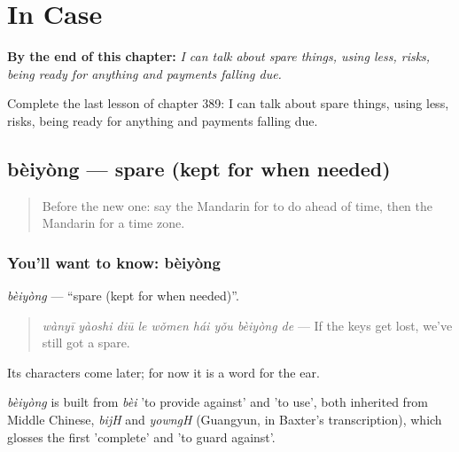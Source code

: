 
\chapter{In Case}
\label{ch:zh-in-case}

\begin{chapteropening}
\textbf{By the end of this chapter:} \emph{I can talk about spare things, using less, risks, being ready for anything and payments falling due.}

Complete the last lesson of chapter 389: I can talk about spare things, using less, risks, being ready for anything and payments falling due.
\end{chapteropening}

\section[bèiyòng]{bèiyòng — spare (kept for when needed)}

\label{lesson:ZH-C389-beiyong}



\begin{quote}
Before the new one: say the Mandarin for to do ahead of time, then the Mandarin for a time zone.
\end{quote}

\subsection*{You'll want to know: bèiyòng}
\emph{bèiyòng} — \textquotedblleft{}spare (kept for when needed)\textquotedblright{}.

\begin{quote}
\emph{wànyī yàoshi diū le wǒmen hái yǒu bèiyòng de} — If the keys get lost, we've still got a spare.
\end{quote}

Its characters come later; for now it is a word for the ear.

\begin{cousinweb}
\emph{bèiyòng} is built from \emph{bèi} 'to provide against' and  'to use', both inherited from Middle Chinese, \emph{bijH} and \emph{yowngH} (Guangyun, in Baxter's transcription), which glosses the first 'complete' and 'to guard against'.
\end{cousinweb}

